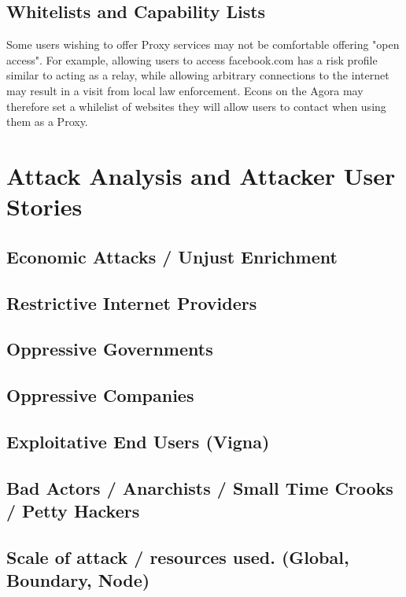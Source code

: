 \documentclass{article}
\begin{document}
\subsection{Whitelists and Capability Lists}

Some users wishing to offer Proxy services may not be comfortable offering "open access". For example, allowing users to access facebook.com has a risk profile similar to acting as a relay, while allowing arbitrary connections to the internet may result in a visit from local law enforcement. Econs on the Agora may therefore set a whilelist of websites they will allow users to contact when using them as a Proxy.

\section{Attack Analysis and Attacker User Stories}

\subsection{Economic Attacks / Unjust Enrichment}

\subsection{Restrictive Internet Providers}

\subsection{Oppressive Governments}

\subsection{Oppressive Companies}

\subsection{Exploitative End Users (Vigna)}

\subsection{Bad Actors / Anarchists / Small Time Crooks / Petty Hackers}

\subsection{Scale of attack / resources used. (Global, Boundary, Node)}
\end{document}
